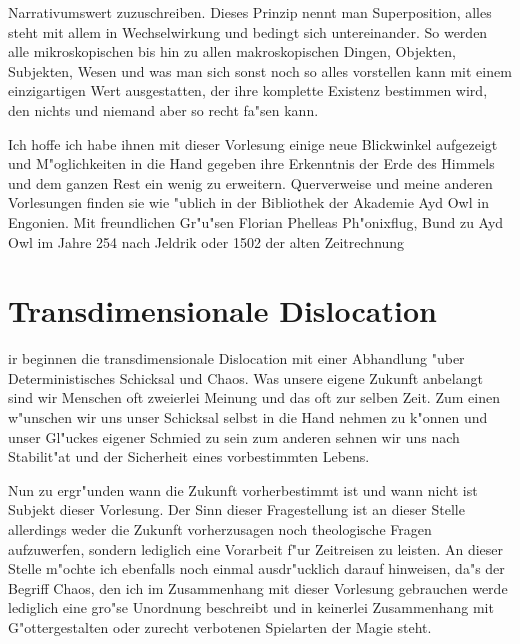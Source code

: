 \documentclass[a5paper,8pt]{book}
\begin{document}
Narrativumswert zuzuschreiben. Dieses Prinzip nennt man Superposition, alles steht mit allem in Wechselwirkung und bedingt sich untereinander. So werden alle mikroskopischen bis hin zu allen makroskopischen Dingen, Objekten, Subjekten, Wesen und was man sich sonst noch so alles vorstellen kann mit einem einzigartigen Wert ausgestatten, der ihre komplette Existenz bestimmen wird, den nichts und niemand aber so recht fa"sen kann.

Ich hoffe ich habe ihnen mit dieser Vorlesung einige neue Blickwinkel aufgezeigt und M"oglichkeiten in die Hand gegeben ihre Erkenntnis der Erde des Himmels und dem ganzen Rest ein wenig zu erweitern. Querverweise und meine anderen Vorlesungen finden sie wie "ublich in der Bibliothek der Akademie Ayd Owl in Engonien.
\vspace{10mm}
Mit freundlichen Gr"u"sen
Florian Phelleas Ph"onixflug, Bund zu Ayd Owl
im Jahre 254 nach Jeldrik oder 1502 der alten Zeitrechnung

\newpage

\section{ Transdimensionale Dislocation}

ir beginnen die transdimensionale Dislocation mit einer Abhandlung "uber Deterministisches Schicksal und Chaos. Was unsere eigene Zukunft anbelangt sind wir Menschen oft zweierlei Meinung und das oft zur selben Zeit. Zum einen w"unschen wir uns unser Schicksal selbst in die Hand nehmen zu k"onnen und unser Gl"uckes eigener Schmied zu sein zum anderen sehnen wir uns nach Stabilit"at und der Sicherheit eines vorbestimmten Lebens.

Nun zu ergr"unden wann die Zukunft vorherbestimmt ist und wann nicht ist Subjekt dieser Vorlesung. Der Sinn dieser Fragestellung ist an dieser Stelle allerdings weder die Zukunft vorherzusagen noch theologische Fragen aufzuwerfen, sondern lediglich eine Vorarbeit f"ur Zeitreisen zu leisten. An dieser Stelle m"ochte ich ebenfalls noch einmal ausdr"ucklich darauf hinweisen, da"s der Begriff Chaos, den ich im Zusammenhang mit dieser Vorlesung gebrauchen werde lediglich eine gro"se Unordnung beschreibt und in keinerlei Zusammenhang mit G"ottergestalten oder zurecht verbotenen Spielarten der Magie steht.
\end{document}
